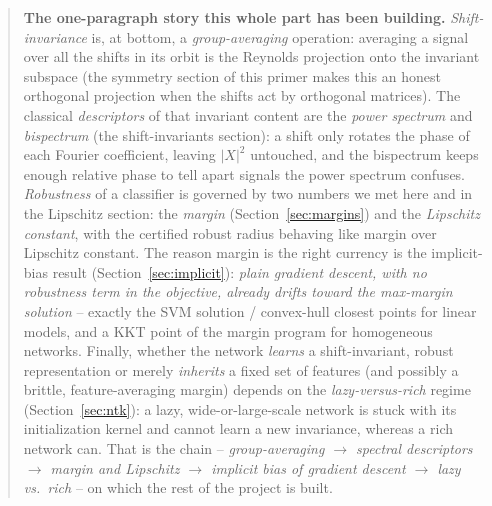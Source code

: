 \begin{quote}
\textbf{The one-paragraph story this whole part has been building.}
\emph{Shift-invariance} is, at bottom, a \emph{group-averaging} operation:
averaging a signal over all the shifts in its orbit is the Reynolds
projection onto the invariant subspace (the symmetry section of this
primer makes this an honest orthogonal projection when the shifts act by
orthogonal matrices). The classical \emph{descriptors} of that invariant
content are the \emph{power spectrum} and \emph{bispectrum} (the
shift-invariants section): a shift only rotates the phase of each Fourier
coefficient, leaving $|X|^2$ untouched, and the bispectrum keeps enough
relative phase to tell apart signals the power spectrum confuses.
\emph{Robustness} of a classifier is governed by two numbers we met here
and in the Lipschitz section: the \emph{margin} (Section~\ref{sec:margins})
and the \emph{Lipschitz constant}, with the certified robust radius
behaving like margin over Lipschitz constant. The reason margin is the
right currency is the implicit-bias result
(Section~\ref{sec:implicit}): \emph{plain gradient descent, with no
robustness term in the objective, already drifts toward the max-margin
solution} -- exactly the SVM solution / convex-hull closest points for
linear models, and a KKT point of the margin program for homogeneous
networks. Finally, whether the network \emph{learns} a shift-invariant,
robust representation or merely \emph{inherits} a fixed set of features
(and possibly a brittle, feature-averaging margin) depends on the
\emph{lazy-versus-rich} regime (Section~\ref{sec:ntk}): a lazy,
wide-or-large-scale network is stuck with its initialization kernel and
cannot learn a new invariance, whereas a rich network can. That is the
chain -- \emph{group-averaging $\rightarrow$ spectral descriptors
$\rightarrow$ margin and Lipschitz $\rightarrow$ implicit bias of gradient
descent $\rightarrow$ lazy vs.\ rich} -- on which the rest of the project
is built.
\end{quote}


